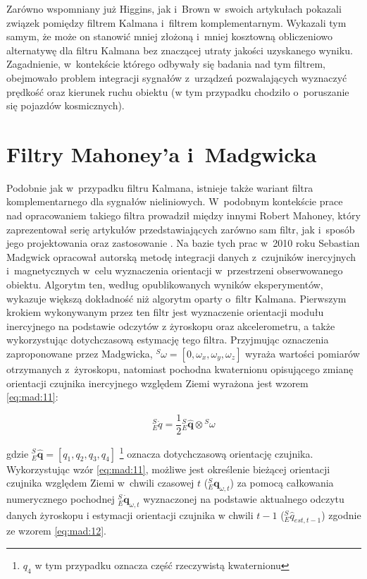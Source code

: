 Zarówno wspomniany już Higgins, jak i~Brown \cite{BROWN1972} w~swoich artykułach pokazali związek pomiędzy filtrem Kalmana i~filtrem komplementarnym. Wykazali tym samym, że może on stanowić mniej złożoną i~mniej kosztowną obliczeniowo alternatywę dla filtru Kalmana bez znaczącej utraty jakości uzyskanego wyniku. Zagadnienie, w~kontekście którego odbywały się badania nad tym filtrem, obejmowało problem integracji sygnałów z~urządzeń pozwalających wyznaczyć prędkość oraz kierunek ruchu obiektu (w tym przypadku chodziło o~poruszanie się pojazdów kosmicznych).
\section*{Filtry Mahoney'a i~Madgwicka}
Podobnie jak w~przypadku filtru Kalmana, istnieje także wariant filtra komplementarnego dla sygnałów nieliniowych. W~podobnym kontekście prace nad opracowaniem takiego filtra prowadził między innymi Robert Mahoney, który zaprezentował serię artykułów przedstawiających zarówno sam filtr, jak i~sposób jego projektowania oraz zastosowanie \cite{Baldwin2007,Mahony2005a,Mahony2008,Euston2008}. 
Na bazie tych prac w~2010 roku Sebastian Madgwick opracował autorską metodę \cite{Madgwick2010,Madgwick2011} integracji danych z~czujników inercyjnych i~magnetycznych w~celu wyznaczenia orientacji w~przestrzeni obserwowanego obiektu. Algorytm ten, według opublikowanych wyników eksperymentów, wykazuje większą dokładność niż algorytm oparty o~filtr Kalmana.
Pierwszym krokiem wykonywanym przez ten filtr jest wyznaczenie orientacji modułu inercyjnego na podstawie odczytów z żyroskopu oraz akcelerometru, a także wykorzystując dotychczasową estymację tego filtra. Przyjmując oznaczenia zaproponowane przez Madgwicka, $^S \omega = [0,\omega_x,\omega_y,\omega_z]$ wyraża wartości pomiarów otrzymanych z~żyroskopu, natomiast pochodna kwaternionu opisującego zmianę orientacji czujnika inercyjnego względem Ziemi wyrażona jest wzorem \ref{eq:mad:11}:

\begin{equation}
	{^S_E \dot{q}} = \frac{1}{2}{^S_E \hat{\mathbf{q}}}\otimes {^S{\omega}}
	\label{eq:mad:11}
\end{equation}

gdzie ${^S_E \hat{\mathbf{q}} = [q_1,q_2,q_3,q_4]}$ \footnote{$q_4$ w tym przypadku oznacza część rzeczywistą kwaternionu} oznacza dotychczasową orientację czujnika. Wykorzystując wzór \ref{eq:mad:11}, możliwe jest określenie bieżącej orientacji czujnika względem Ziemi w~chwili czasowej $t$ ($^S_E{\mathbf{q}}_{\omega,t}$) za pomocą całkowania numerycznego pochodnej $^S_E\dot{\mathbf{q}}_{\omega,t}$ wyznaczonej na podstawie aktualnego odczytu danych żyroskopu i estymacji orientacji czujnika w chwili $t-1$ (${^S_E \hat{q}_{est, t-1}}$) zgodnie ze wzorem \ref{eq:mad:12}.

